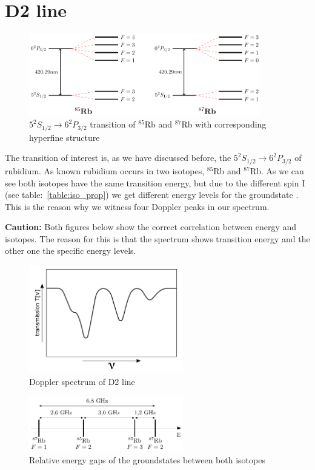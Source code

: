 
\section{D2 line} %

\begin{figure}[h]
\centering
\includegraphics[width=0.9\textwidth]{energylevel}
\caption{\(5^{2}S_{1/2} \rightarrow 6^{2}P_{3/2}\) transition of \(^{85}\)Rb and \(^{87}\)Rb with corresponding hyperfine structure}    
\end{figure}

\vspace{\fill}

The transition of interest is, as we have discussed before, the \(5^{2}S_{1/2} \rightarrow 6^{2}P_{3/2}\) of rubidium. As known rubidium
occurs in two isotopes, \(^{85}\)Rb and \(^{87}\)Rb.
As we can see both isotopes have the same transition energy, but due to the different spin I (see table:~\ref{table:iso_prop}) we get
different energy levels for the groundstate \citep{nist_asd}. This is the reason why we witness four Doppler peaks in our spectrum.
\bigskip

\textbf{Caution:} Both figures below show the correct correlation between energy and isotopes. The reason for this is that the spectrum
shows transition energy and the other one the specific energy levels.

\vspace{\fill}

\begin{figure}[h]
\centering
\includegraphics[width=0.6\textwidth]{spectrum_doppler}
\caption{\label{fig:doppler}Doppler spectrum of D2 line} 
\end{figure}

\vspace{\fill}

\begin{figure}[ht]
\centering
\includegraphics[width=0.6\textwidth]{groundstate}
\caption{\label{fig:gap}Relative energy gaps of the groundstates between both isotopes} 
\end{figure}